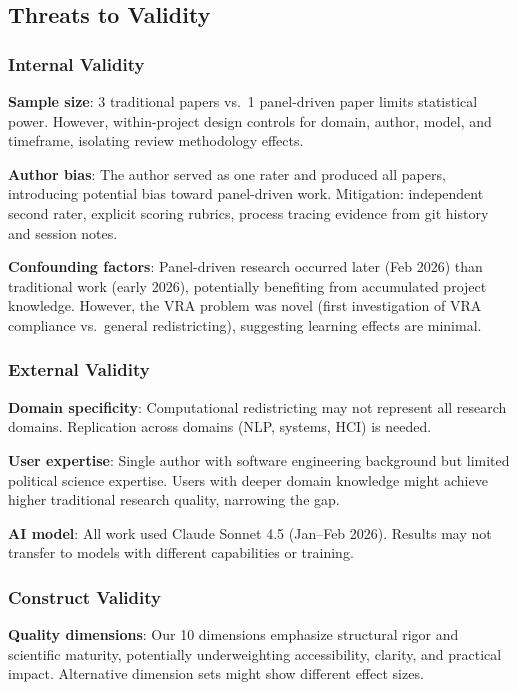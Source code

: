 \subsection{Threats to Validity}

\subsubsection{Internal Validity}

\textbf{Sample size}: 3 traditional papers vs.\ 1 panel-driven paper limits statistical power. However, within-project design controls for domain, author, model, and timeframe, isolating review methodology effects.

\textbf{Author bias}: The author served as one rater and produced all papers, introducing potential bias toward panel-driven work. Mitigation: independent second rater, explicit scoring rubrics, process tracing evidence from git history and session notes.

\textbf{Confounding factors}: Panel-driven research occurred later (Feb 2026) than traditional work (early 2026), potentially benefiting from accumulated project knowledge. However, the VRA problem was novel (first investigation of VRA compliance vs.\ general redistricting), suggesting learning effects are minimal.

\subsubsection{External Validity}

\textbf{Domain specificity}: Computational redistricting may not represent all research domains. Replication across domains (NLP, systems, HCI) is needed.

\textbf{User expertise}: Single author with software engineering background but limited political science expertise. Users with deeper domain knowledge might achieve higher traditional research quality, narrowing the gap.

\textbf{AI model}: All work used Claude Sonnet 4.5 (Jan--Feb 2026). Results may not transfer to models with different capabilities or training.

\subsubsection{Construct Validity}

\textbf{Quality dimensions}: Our 10 dimensions emphasize structural rigor and scientific maturity, potentially underweighting accessibility, clarity, and practical impact. Alternative dimension sets might show different effect sizes.


